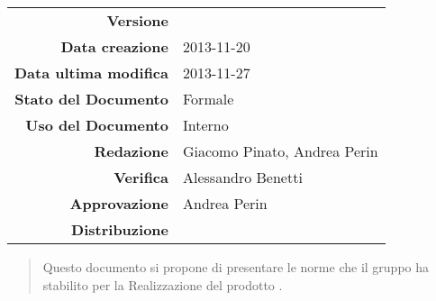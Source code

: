 

\newcommand{\Versione}{\versioneNormeDiProgetto{}}	%
\newcommand{\Data}{2013-11-20}						%
\newcommand{\DataUltimaModifica}{2013-11-27}
\newcommand{\TipoDocumento}{Norme di Progetto}		%




\begin{center}
\begin{tabular}{r|l}
\textbf{Versione} & \Versione{} \\
\textbf{Data creazione} & \Data{} \\
\textbf{Data ultima modifica} & \DataUltimaModifica{} \\
\textbf{Stato del Documento} & Formale \\		%
\textbf{Uso del Documento} & Interno \\			%
\textbf{Redazione} & Giacomo Pinato, Andrea Perin\\			%
\textbf{Verifica} & Alessandro Benetti\\			%
\textbf{Approvazione} & Andrea Perin\\				%
\textbf{Distribuzione} & \parbox[t]{4cm}{\NomeGruppo{}}\\
\end{tabular}
\end{center}

\vspace{0.05in}

\begin{abstract}
\begin{center}
Questo documento si propone di presentare le norme che il gruppo \textbf{\NomeGruppo{}} ha stabilito per la Realizzazione del prodotto \textbf{\Progetto{}}.
\end{center}
\end{abstract}

